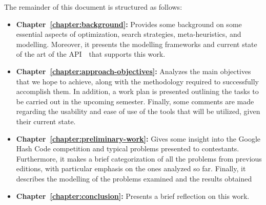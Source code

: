 The remainder of this document is structured as follows:

\begin{itemize}
      \item \textbf{Chapter~\ref{chapter:background}:} Provides some background
            on some essential aspects of optimization, search strategies,
            meta-heuristics, and modelling. Moreover, it presents the modelling
            frameworks and current state of the art of the API~\cite{outeiro2021application}~that
            supports this work.

      \item \textbf{Chapter~\ref{chapter:approach-objectives}:} Analyzes the main objectives
            that we hope to achieve, along with the methodology required to successfully
            accomplish them. In addition, a work plan is presented outlining the tasks to
            be carried out in the upcoming semester. Finally, some comments are made
            regarding the usability and ease of use of the tools that will be utilized,
            given their current state.


      \item \textbf{Chapter~\ref{chapter:preliminary-work}:}
            Gives some insight into the Google Hash Code competition and typical
            problems presented to contestants. Furthermore, it makes a brief
            categorization of all the problems from previous editions, with particular
            emphasis on the ones analyzed so far. Finally, it describes the modelling
            of the problems examined and the results obtained


      \item \textbf{Chapter~\ref{chapter:conclusion}:} Presents a brief reflection on this work.
\end{itemize}


